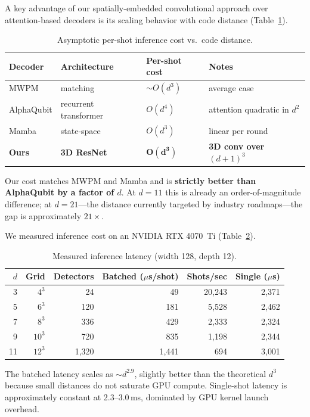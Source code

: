 \documentclass[11pt,a4paper]{article}
\begin{document}
A key advantage of our spatially-embedded convolutional approach over
attention-based decoders is its scaling behavior with code distance
(Table~\ref{tab:complexity}).

\begin{table}[htbp]
\centering
\caption{Asymptotic per-shot inference cost vs.\ code distance.}
\label{tab:complexity}
\begin{tabular}{@{}llll@{}}
\toprule
Decoder & Architecture & Per-shot cost & Notes \\
\midrule
MWPM & matching & ${\sim}O(d^3)$ & average case \\
AlphaQubit & recurrent transformer & $O(d^4)$ & attention quadratic in $d^2$ \\
Mamba & state-space & $O(d^3)$ & linear per round \\
\textbf{Ours} & \textbf{3D ResNet} & $\bm{O(d^3)}$ & \textbf{3D conv over $(d{+}1)^3$} \\
\bottomrule
\end{tabular}
\end{table}

Our cost matches MWPM and Mamba and is \textbf{strictly better than
AlphaQubit by a factor of $d$}. At $d=11$ this is already an
order-of-magnitude difference; at $d=21$---the distance currently
targeted by industry roadmaps---the gap is approximately $21\times$.

We measured inference cost on an NVIDIA RTX 4070~Ti
(Table~\ref{tab:latency}).

\begin{table}[htbp]
\centering
\caption{Measured inference latency (width 128, depth 12).}
\label{tab:latency}
\begin{tabular}{@{}rrrrrr@{}}
\toprule
$d$ & Grid & Detectors & Batched ($\mu$s/shot) & Shots/sec & Single ($\mu$s) \\
\midrule
3 & $4^3$ & 24 & 49 & 20{,}243 & 2{,}371 \\
5 & $6^3$ & 120 & 181 & 5{,}528 & 2{,}462 \\
7 & $8^3$ & 336 & 429 & 2{,}333 & 2{,}324 \\
9 & $10^3$ & 720 & 835 & 1{,}198 & 2{,}344 \\
11 & $12^3$ & 1{,}320 & 1{,}441 & 694 & 3{,}001 \\
\bottomrule
\end{tabular}
\end{table}

The batched latency scales as ${\sim}d^{2.9}$, slightly better than the
theoretical $d^3$ because small distances do not saturate GPU compute.
Single-shot latency is approximately constant at 2.3--3.0\,ms, dominated
by GPU kernel launch overhead.
\end{document}
